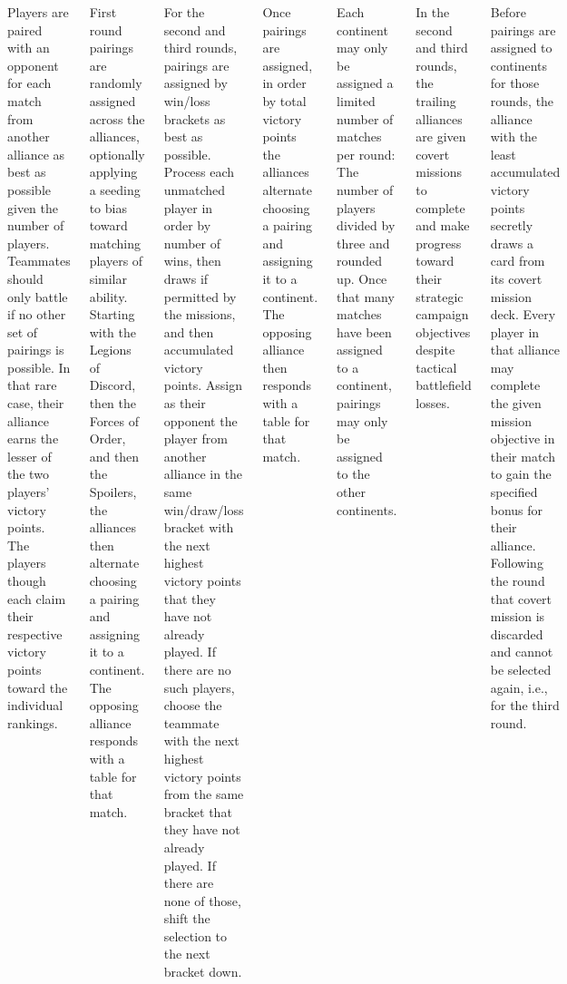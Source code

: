 \begin{columns}
\pagebreak
{}

Players are paired with an opponent for each match from another
alliance as best as possible given the number of players.  Teammates
should only battle if no other set of pairings is possible.  In that
rare case, their alliance earns the lesser of the two players' victory
points.  The players though each claim their respective victory points
toward the individual rankings.

First round pairings are randomly assigned across the alliances,
optionally applying a seeding to bias toward matching players of
similar ability.  Starting with the Legions of Discord, then the
Forces of Order, and then the Spoilers, the alliances then alternate
choosing a pairing and assigning it to a continent.  The opposing
alliance responds with a table for that match.

For the second and third rounds, pairings are assigned by win/loss
brackets as best as possible.  Process each unmatched player in order
by number of wins, then draws if permitted by the missions, and then
accumulated victory points.  Assign as their opponent the player from
another alliance in the same win/draw/loss bracket with the next
highest victory points that they have not already played.  If there
are no such players, choose the teammate with the next highest victory
points from the same bracket that they have not already played.  If
there are none of those, shift the selection to the next bracket down.

Once pairings are assigned, in order by total victory points the
alliances alternate choosing a pairing and assigning it to a
continent.  The opposing alliance then responds with a table for that
match.

Each continent may only be assigned a limited number of matches per
round: The number of players divided by three and rounded up.  Once
that many matches have been assigned to a continent, pairings may only
be assigned to the other continents.



In the second and third rounds, the trailing alliances are given
covert missions to complete and make progress toward their strategic
campaign objectives despite tactical battlefield losses.

Before pairings are assigned to continents for those rounds, the
alliance with the least accumulated victory points secretly draws a
card from its covert mission deck.  Every player in that alliance may
complete the given mission objective in their match to gain the
specified bonus for their alliance.  Following the round that covert
mission is discarded and cannot be selected again, i.e., for the third
round.


\end{columns}
